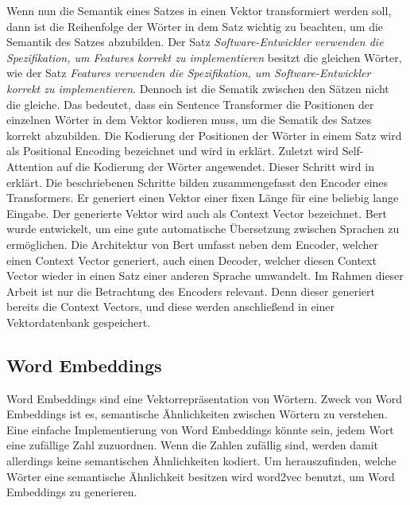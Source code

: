 Wenn nun die Semantik eines Satzes in einen Vektor transformiert werden soll, dann ist die Reihenfolge der Wörter in dem Satz wichtig zu beachten, um die Semantik des Satzes abzubilden.
Der Satz \textit{Software-Entwickler verwenden die Spezifikation, um Features korrekt zu implementieren} besitzt die gleichen Wörter, wie der Satz \textit{Features verwenden die Spezifikation, um Software-Entwickler korrekt zu implementieren}.
Dennoch ist die Sematik zwischen den Sätzen nicht die gleiche.
Das bedeutet, dass ein Sentence Transformer die Positionen der einzelnen Wörter in dem Vektor kodieren muss, um die Sematik des Satzes korrekt abzubilden.
Die Kodierung der Positionen der Wörter in einem Satz wird als Positional Encoding bezeichnet und wird in  erklärt.
Zuletzt wird Self-Attention auf die Kodierung der Wörter angewendet.
Dieser Schritt wird in  erklärt.
Die beschriebenen Schritte bilden zusammengefasst den Encoder eines Transformers.
Er generiert einen Vektor einer fixen Länge für eine beliebig lange Eingabe.
Der generierte Vektor wird auch als Context Vector bezeichnet.
Bert wurde entwickelt, um eine gute automatische Übersetzung zwischen Sprachen zu ermöglichen.
Die Architektur von Bert umfasst neben dem Encoder, welcher einen Context Vector generiert, auch einen Decoder, welcher diesen Context Vector wieder in einen Satz einer anderen Sprache umwandelt.
Im Rahmen dieser Arbeit ist nur die Betrachtung des Encoders relevant.
Denn dieser generiert bereits die Context Vectors, und diese werden anschließend in einer Vektordatenbank gespeichert.

\subsection{Word Embeddings}
\label{chap:word-embeddings}
Word Embeddings sind eine Vektorrepräsentation von Wörtern.
Zweck von Word Embeddings ist es, semantische Ähnlichkeiten zwischen Wörtern zu verstehen.
Eine einfache Implementierung von Word Embeddings könnte sein, jedem Wort eine zufällige Zahl zuzuordnen.
Wenn die Zahlen zufällig sind, werden damit allerdings keine semantischen Ähnlichkeiten kodiert.
Um herauszufinden, welche Wörter eine semantische Ähnlichkeit besitzen wird word2vec benutzt, um Word Embeddings zu generieren.\\


